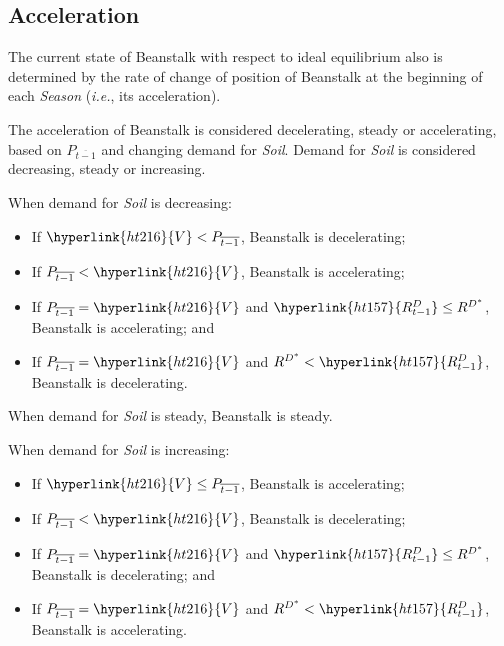 \documentclass[tikz]{article}
\newcommand{\term}[1]{\textsl{#1}}
\begin{document}

\subsection{Acceleration}

The current state of Beanstalk with respect to ideal equilibrium also is determined by the rate of change of position of Beanstalk at the beginning of each \term{Season} (\term{i.e.}, its acceleration).

The acceleration of Beanstalk is considered decelerating, steady or accelerating, based on $P_{\overline{t-1}}$ and changing demand for \term{Soil}. Demand for \term{Soil} is considered decreasing, steady or increasing. 

When demand for \term{Soil} is decreasing:

\begin{itemize}[topsep=0pt, itemsep=1pt]
    \item If $\hyperlink{ht216}{V} < P_{\overline{t-1}}$, Beanstalk is decelerating;
    \item If $P_{\overline{t-1}} < \hyperlink{ht216}{V}$, Beanstalk is accelerating;
    \item If $P_{\overline{t-1}} = \hyperlink{ht216}{V}$ and $\hyperlink{ht157}{R^D_{t-1}} \leq R^{D^*}$, Beanstalk is accelerating; and 
    \item If $P_{\overline{t-1}} = \hyperlink{ht216}{V}$ and $R^{D^*} < \hyperlink{ht157}{R^D_{t-1}}$, Beanstalk is decelerating. 
\end{itemize}

When demand for \term{Soil} is steady, Beanstalk is steady.

When demand for \term{Soil} is increasing:

\begin{itemize}[topsep=0pt, itemsep=1pt]
    \item If $\hyperlink{ht216}{V} \leq P_{\overline{t-1}}$, Beanstalk is accelerating; 
    \item If $P_{\overline{t-1}} < \hyperlink{ht216}{V}$, Beanstalk is decelerating;
    \item If $P_{\overline{t-1}} = \hyperlink{ht216}{V}$ and $\hyperlink{ht157}{R^D_{t-1}} \leq R^{D^*}$, Beanstalk is decelerating; and 
    \item If $P_{\overline{t-1}} = \hyperlink{ht216}{V}$ and $R^{D^*} < \hyperlink{ht157}{R^D_{t-1}}$, Beanstalk is accelerating. 
\end{itemize}
\end{document}
